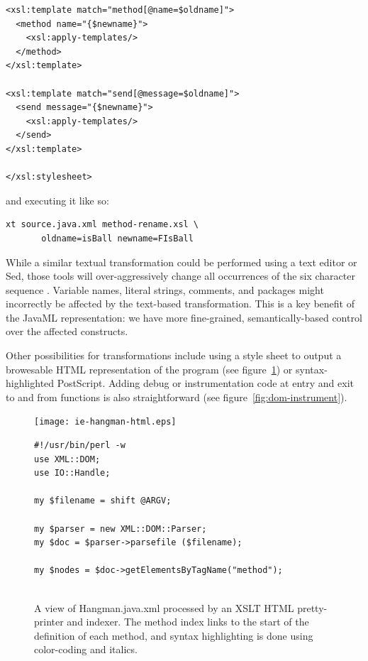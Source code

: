 \documentclass{article}
\begin{document}
\begin{multicols}{2}
{\begin{verbatim}
<xsl:template match="method[@name=$oldname]">
  <method name="{$newname}">
    <xsl:apply-templates/>
  </method>
</xsl:template>

<xsl:template match="send[@message=$oldname]">
  <send message="{$newname}">
    <xsl:apply-templates/>
  </send>
</xsl:template>

</xsl:stylesheet>
\end{verbatim}
}

\noindent and executing it like so:

\begin{verbatim}
xt source.java.xml method-rename.xsl \
       oldname=isBall newname=FIsBall
\end{verbatim}

While a similar textual transformation could be performed using a text
editor or Sed, those tools will over-aggressively change all occurrences
of the six character sequence \smtexttt{isBall}. Variable names, literal
strings, comments, and packages might incorrectly be affected by the
text-based transformation. This is a key benefit of the JavaML
representation: we have more fine-grained, semantically-based control
over the affected constructs.

Other possibilities for transformations include using a style sheet to output a
browesable HTML representation of the program (see figure~\ref{fig:ie-hangman-html})
or syntax-highlighted PostScript.  Adding debug or instrumentation code at entry and
exit to and from functions is also straightforward (see figure~\ref{fig:dom-instrument}).

\begin{figure}[htbp]
\begin{minipage}[b]{0.4\linewidth}
\texttt{[image: ie-hangman-html.eps]}
\caption{A view of Hangman.java.xml processed by an XSLT HTML pretty-printer and
  indexer.  The method index links to the start of the definition of each method, and 
  syntax highlighting is done using color-coding and italics.
\label{fig:ie-hangman-html}}
\end{minipage}%
\hspace*{15pt}
\begin{minipage}[b]{0.55\linewidth}
{\small
\begin{verbatim}
#!/usr/bin/perl -w
use XML::DOM;
use IO::Handle;

my $filename = shift @ARGV;

my $parser = new XML::DOM::Parser;
my $doc = $parser->parsefile ($filename);

my $nodes = $doc->getElementsByTagName("method");


\end{verbatim}}
\end{minipage}
\end{figure}
\end{multicols}
\end{document}
